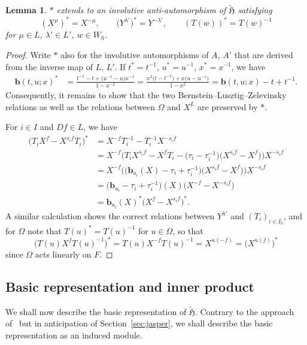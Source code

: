 \documentclass[10pt,a4paper]{amsart}
\newtheorem{Lemma}[Theorem]{Lemma}
\theoremstyle{definition}
\numberwithin{equation}{section}
\begin{document}
\begin{Lemma}\label{sec:lem-existence-involution}
 $*$ extends to an involutive anti-automorphism of $\tilde{\mathfrak{H}}$ satisfying
 \[
 (X^\mu)^* = X^{-\mu},\qquad
 \bigl(Y^{\lambda'}\bigr)^* = Y^{-\lambda'},\qquad
 (T(w))^* = T(w)^{-1}
 \]
 for $\mu\in L$, $\lambda'\in L'$, $w\in W_0$.
\end{Lemma}
\begin{proof}
 Write $*$ also for the involutive automorphisms of $A$, $A'$ that are derived from
 the inverse map of $L$, $L'$. If $t^*=t^{-1}$, $u^*=u^{-1}$, $x^*=x^{-1}$, we have
 \begin{align*}
 \bm{b}(t,u;x)^* &= \frac{t^{-1} - t + \bigl(u^{-1}-u\bigr)x^{-1}}{1-x^{-2}}
 = \frac{x^2\bigl(t-t^{-1}\bigr) + x\bigl(u-u^{-1}\bigr)}{1-x^2}= \bm{b}(t,u;x) - t + t^{-1}.
 \end{align*}
 Consequently, it remains to show that the two Bernstein--Lusztig--Zelevinsky relations as well
 as the relations between $\Omega$ and $X^L$ are preserved by $*$.

 For $i\in I$ and $Df\in L$, we have
 \begin{align*}
 \bigl(T_i X^f - X^{s_if}T_i\bigr)^*
 &= X^{-f} T_i^{-1} - T_i^{-1} X^{-s_if}\\
 &= X^{-f} \bigl(T_i X^{s_if} - X^f T_i - \bigl(\tau_i-\tau_i^{-1}\bigr)\bigl(X^{s_if}- X^f\bigr)\bigr) X^{-s_if}\\
 &= X^{-f} \bigl(\bigl(\bm{b}_{a_i}(X) - \tau_i + \tau_i^{-1}\bigr)\bigl(X^{s_if} - X^f\bigr)\bigr)
 X^{-s_if}\\
 &= \bigl(\bm{b}_{a_i} - \tau_i + \tau_i^{-1}\bigr)(X)\bigl(X^{-f} - X^{-s_if}\bigr)\\
 &= \bm{b}_{a_i}(X)^* \bigl(X^f - X^{s_i f}\bigr)^*.
 \end{align*}
 A similar calculation shows the correct relations between
 $Y^{\lambda'}$ and $(T_i)_{i\in I_0}$, and for $\Omega$ note that $T(u)^*=T(u)^{-1}$ for $u\in\Omega$, so that
 \[
 \bigl(T(u) X^f T(u)^{-1}\bigr)^*
 = T(u) X^{-f} T(u)^{-1}
 = X^{u(-f)}
 = \bigl(X^{u(f)}\bigr)^*
 \]
 since $\Omega$ acts linearly on $F$.
\end{proof}

\subsection{Basic representation and inner product}
We shall now describe the basic representation of $\tilde{\mathfrak{H}}$.
Contrary to the approach of~\cite{macdonald} but in anticipation of Section~\ref{sec:jasper}, we shall describe the basic representation as an induced module.
\end{document}
